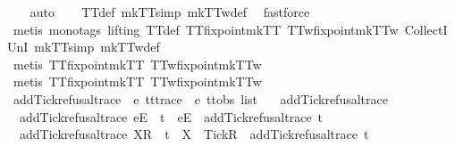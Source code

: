 \begin{isabellebody}
%
\isadelimproof
\ \ %
\endisadelimproof
%
\isatagproof
{}\isamarkupfalse%
\ auto\isanewline
\ \ \isamarkupfalse%
\ TT{}{\isacharunderscore}def\ mkTT{}{\isacharunderscore}simp\ mkTT{}w{\isacharunderscore}def\ \isamarkupfalse%
\ fastforce\isanewline
\ \ \isamarkupfalse%
\ {\isacharparenleft}metis\ {\isacharparenleft}mono{\isacharunderscore}tags{\isacharcomma}\ lifting{\isacharparenright}\ TT{}{\isacharunderscore}def\ TT{}{\isacharunderscore}fixpoint{\isacharunderscore}mkTT{}\ TT{}w{\isacharunderscore}fixpoint{\isacharunderscore}mkTT{}w\ CollectI\ UnI{}\ mkTT{}{\isacharunderscore}simp\ mkTT{}w{\isacharunderscore}def{\isacharparenright}\ \ \isanewline
\ \ \ \ \isamarkupfalse%
\ {\isacharparenleft}metis\ TT{}{\isacharunderscore}fixpoint{\isacharunderscore}mkTT{}\ TT{}w{\isacharunderscore}fixpoint{\isacharunderscore}mkTT{}w{\isacharparenright}\isanewline
\ \ \ \ \isamarkupfalse%
\ {\isacharparenleft}metis\ TT{}{\isacharunderscore}fixpoint{\isacharunderscore}mkTT{}\ TT{}w{\isacharunderscore}fixpoint{\isacharunderscore}mkTT{}w{\isacharparenright}%
\endisatagproof
{\isafoldproof}%
%
\isadelimproof
\isanewline
%
\endisadelimproof
\isanewline
{}\isamarkupfalse%
\ add{\isacharunderscore}Tick{\isacharunderscore}refusal{\isacharunderscore}trace\ {\isacharcolon}{\isacharcolon}\ {\isachardoublequoteopen}{\isacharprime}e\ tttrace\ {\isasymRightarrow}\ {\isacharprime}e\ ttobs\ list{\isachardoublequoteclose}\ \isanewline
\ \ {\isachardoublequoteopen}add{\isacharunderscore}Tick{\isacharunderscore}refusal{\isacharunderscore}trace\ {\isacharbrackleft}{\isacharbrackright}\ {\isacharequal}\ {\isacharbrackleft}{\isacharbrackright}{\isachardoublequoteclose}\ {\isacharbar}\isanewline
\ \ {\isachardoublequoteopen}add{\isacharunderscore}Tick{\isacharunderscore}refusal{\isacharunderscore}trace\ {\isacharparenleft}{\isacharbrackleft}e{\isacharbrackright}\isactrlsub E\ {\isacharhash}\ t{\isacharparenright}\ {\isacharequal}\ {\isacharbrackleft}e{\isacharbrackright}\isactrlsub E\ {\isacharhash}\ add{\isacharunderscore}Tick{\isacharunderscore}refusal{\isacharunderscore}trace\ t{\isachardoublequoteclose}\ {\isacharbar}\isanewline
\ \ {\isachardoublequoteopen}add{\isacharunderscore}Tick{\isacharunderscore}refusal{\isacharunderscore}trace\ {\isacharparenleft}{\isacharbrackleft}X{\isacharbrackright}\isactrlsub R\ {\isacharhash}\ t{\isacharparenright}\ {\isacharequal}\ {\isacharbrackleft}X\ {\isasymunion}\ {\isacharbraceleft}Tick{\isacharbraceright}{\isacharbrackright}\isactrlsub R\ {\isacharhash}\ add{\isacharunderscore}Tick{\isacharunderscore}refusal{\isacharunderscore}trace\ t{\isachardoublequoteclose}\isanewline

\end{isabellebody}
